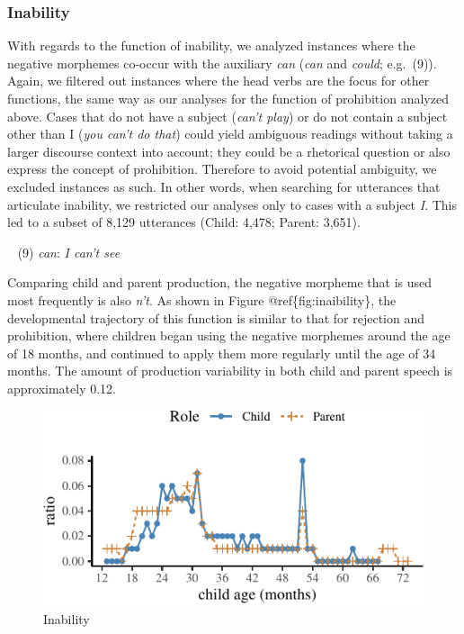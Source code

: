 \documentclass[10pt, letterpaper]{article}
\newenvironment{CodeChunk}{}{}
\begin{document}
\hypertarget{inability}{%
\subsubsection{Inability}\label{inability}}

With regards to the function of inability, we analyzed instances where
the negative morphemes co-occur with the auxiliary \emph{can}
(\emph{can} and \emph{could}; e.g.~(9)). Again, we filtered out
instances where the head verbs are the focus for other functions, the
same way as our analyses for the function of prohibition analyzed above.
Cases that do not have a subject (\emph{can't play}) or do not contain a
subject other than I (\emph{you can't do that}) could yield ambiguous
readings without taking a larger discourse context into account; they
could be a rhetorical question or also express the concept of
prohibition. Therefore to avoid potential ambiguity, we excluded
instances as such. In other words, when searching for utterances that
articulate inability, we restricted our analyses only to cases with a
subject \emph{I}. This led to a subset of 8,129 utterances (Child:
4,478; Parent: 3,651).

~ (9) \emph{can}: \emph{I can't see}

Comparing child and parent production, the negative morpheme that is
used most frequently is also \emph{n't}. As shown in Figure
@ref\{fig:inaibility\}, the developmental trajectory of this function is
similar to that for rejection and prohibition, where children began
using the negative morphemes around the age of 18 months, and continued
to apply them more regularly until the age of 34 months. The amount of
production variability in both child and parent speech is approximately
0.12.

\begin{CodeChunk}
\begin{figure}[H]

{\centering \includegraphics{figs/inability-1} 

}

\caption[Inability]{Inability}\label{fig:inability}
\end{figure}
\end{CodeChunk}
\end{document}
